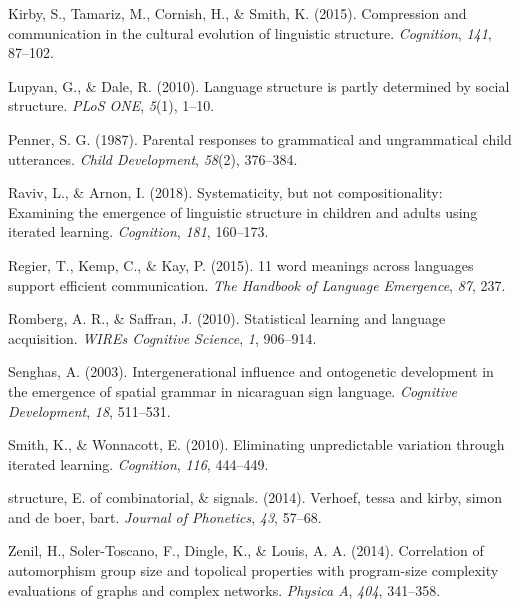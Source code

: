 \documentclass[10pt, letterpaper]{article}
\begin{document}
\hypertarget{ref-kirby-2015}{}
Kirby, S., Tamariz, M., Cornish, H., \& Smith, K. (2015). Compression
and communication in the cultural evolution of linguistic structure.
\emph{Cognition}, \emph{141}, 87--102.

\hypertarget{ref-lupyan-2010}{}
Lupyan, G., \& Dale, R. (2010). Language structure is partly determined
by social structure. \emph{PLoS ONE}, \emph{5}(1), 1--10.

\hypertarget{ref-penner-1987}{}
Penner, S. G. (1987). Parental responses to grammatical and
ungrammatical child utterances. \emph{Child Development}, \emph{58}(2),
376--384.

\hypertarget{ref-raviv-2018}{}
Raviv, L., \& Arnon, I. (2018). Systematicity, but not compositionality:
Examining the emergence of linguistic structure in children and adults
using iterated learning. \emph{Cognition}, \emph{181}, 160--173.

\hypertarget{ref-regier2015}{}
Regier, T., Kemp, C., \& Kay, P. (2015). 11 word meanings across
languages support efficient communication. \emph{The Handbook of
Language Emergence}, \emph{87}, 237.

\hypertarget{ref-romberg-2010}{}
Romberg, A. R., \& Saffran, J. (2010). Statistical learning and language
acquisition. \emph{WIREs Cognitive Science}, \emph{1}, 906--914.

\hypertarget{ref-senghas-2003}{}
Senghas, A. (2003). Intergenerational influence and ontogenetic
development in the emergence of spatial grammar in nicaraguan sign
language. \emph{Cognitive Development}, \emph{18}, 511--531.

\hypertarget{ref-smith-2010}{}
Smith, K., \& Wonnacott, E. (2010). Eliminating unpredictable variation
through iterated learning. \emph{Cognition}, \emph{116}, 444--449.

\hypertarget{ref-verhoef-2014}{}
structure, E. of combinatorial, \& signals. (2014). Verhoef, tessa and
kirby, simon and de boer, bart. \emph{Journal of Phonetics}, \emph{43},
57--68.

\hypertarget{ref-zenil-2014}{}
Zenil, H., Soler-Toscano, F., Dingle, K., \& Louis, A. A. (2014).
Correlation of automorphism group size and topolical properties with
program-size complexity evaluations of graphs and complex networks.
\emph{Physica A}, \emph{404}, 341--358.


\end{document}
